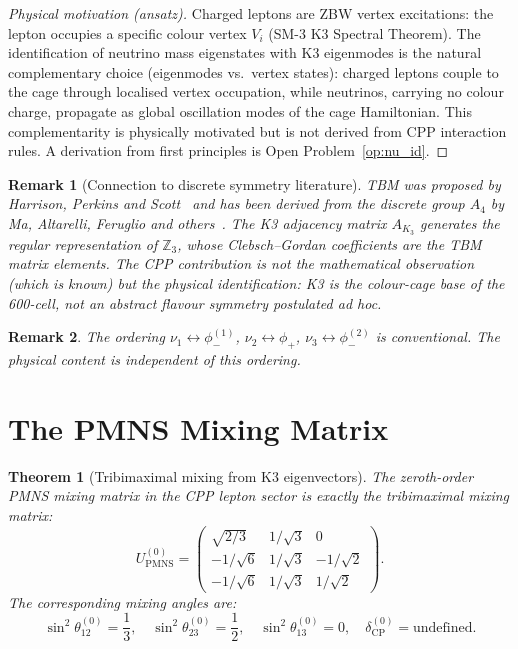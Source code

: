 \documentclass[11pt]{article}
\newtheorem{theorem}{Theorem}[section]
\newtheorem{remark}{Remark}[section]
\newcommand{\PMNS}{\mathrm{PMNS}}
\newcommand{\CP}{\mathrm{CP}}
\begin{document}
\begin{proof}[Physical motivation (ansatz)]
Charged leptons are ZBW vertex excitations: the lepton occupies a
specific colour vertex $V_i$ (SM-3 K3 Spectral Theorem).
The identification of neutrino mass eigenstates with K3 eigenmodes
is the natural complementary choice (eigenmodes vs.\ vertex states):
charged leptons couple to the cage through localised vertex occupation,
while neutrinos, carrying no colour charge, propagate as global
oscillation modes of the cage Hamiltonian.  This complementarity is
physically motivated but is not derived from CPP interaction rules.
A derivation from first principles is Open Problem~\ref{op:nu_id}.
\end{proof}

\begin{remark}[Connection to discrete symmetry literature]
TBM was proposed by Harrison, Perkins and Scott~\cite{Harrison2002}
and has been derived from the discrete group $A_4$ by Ma,
Altarelli, Feruglio and others~\cite{Ma2001,AltarelliFerruglio2010}.
The K3 adjacency matrix $A_{K_3}$ generates the regular representation
of $\mathbb{Z}_3$, whose Clebsch--Gordan coefficients are the TBM
matrix elements.  The CPP contribution is not the mathematical
observation (which is known) but the \emph{physical identification}:
K3 is the colour-cage base of the 600-cell, not an abstract flavour
symmetry postulated ad hoc.
\end{remark}

\begin{remark}
The ordering $\nu_1 \leftrightarrow \phi_-^{(1)}$, $\nu_2 \leftrightarrow \phi_+$,
$\nu_3 \leftrightarrow \phi_-^{(2)}$ is conventional.  The physical
content is independent of this ordering.
\end{remark}

\section{The PMNS Mixing Matrix}

\begin{theorem}[Tribimaximal mixing from K3 eigenvectors]
\label{thm:tbm}
The zeroth-order PMNS mixing matrix in the CPP lepton sector is
exactly the tribimaximal mixing matrix:
\begin{equation}
U_\PMNS^{(0)} = \begin{pmatrix}
\sqrt{2/3} & 1/\sqrt{3} & 0 \\
-1/\sqrt{6} & 1/\sqrt{3} & -1/\sqrt{2} \\
-1/\sqrt{6} & 1/\sqrt{3} & 1/\sqrt{2}
\end{pmatrix}.
\label{eq:Utbm}
\end{equation}
The corresponding mixing angles are:
\begin{equation}
\sin^2\theta_{12}^{(0)} = \frac{1}{3}, \quad
\sin^2\theta_{23}^{(0)} = \frac{1}{2}, \quad
\sin^2\theta_{13}^{(0)} = 0, \quad
\delta_\CP^{(0)} = \text{undefined}.
\label{eq:tbm_angles}
\end{equation}
\end{theorem}
\end{document}
